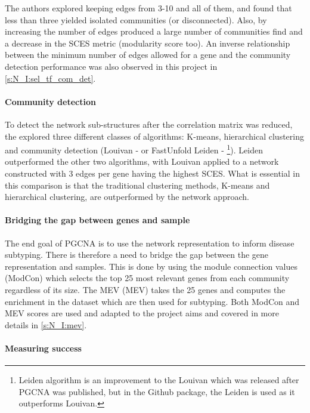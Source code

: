 The authors explored keeping edges from 3-10 and all of them, and found that less than three yielded isolated communities (or disconnected). Also, by increasing the number of edges produced a large number of communities find and a decrease in the SCES metric (modularity score too). An inverse relationship between the minimum number of edges allowed for a gene and the community detection performance was also observed in this project in \cref{s:N_I:sel_tf_com_det}.

\paragraph*{Community detection}

To detect the network sub-structures after the correlation matrix was reduced, the \citet{Care2019-ij} explored three different classes of algorithms: K-means, hierarchical clustering and community detection (Louivan - \cite{Blondel2008-ik} or FastUnfold Leiden - \cite{Traag2019-ne}\footnote{Leiden algorithm is an improvement to the Louivan which was released after PGCNA was published, but in the Github package, the Leiden is used as it outperforms Louivan.}). Leiden outperformed the other two algorithms, with Louivan applied to a network constructed with 3 edges per gene having the highest SCES. What is essential in this comparison is that the traditional clustering methods, K-means and hierarchical clustering, are outperformed by the network approach.

\paragraph*{Bridging the gap between genes and sample}

The end goal of PGCNA is to use the network representation to inform disease subtyping. There is therefore a need to bridge the gap between the gene representation and samples. This is done by using the module connection values (ModCon) which selects the top 25 most relevant genes from each community regardless of its size. The \gls{MEV} (MEV) takes the 25 genes and computes the enrichment in the dataset which are then used for subtyping. Both ModCon and MEV scores are used and adapted to the project aims and covered in more details in \cref{s:N_I:mev}.

\paragraph*{Measuring success} 

